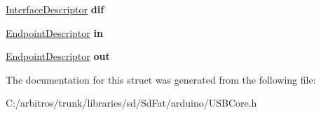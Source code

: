 \begin{DoxyCompactItemize}
\item 
\hypertarget{struct_c_d_c_descriptor_a631454a199b3c6c9ff9764fbe1b19568}{\hyperlink{struct_interface_descriptor}{Interface\-Descriptor} {\bfseries dif}}\label{struct_c_d_c_descriptor_a631454a199b3c6c9ff9764fbe1b19568}

\item 
\hypertarget{struct_c_d_c_descriptor_a93dcef3b3e3062b904269bcad94771b5}{\hyperlink{struct_endpoint_descriptor}{Endpoint\-Descriptor} {\bfseries in}}\label{struct_c_d_c_descriptor_a93dcef3b3e3062b904269bcad94771b5}

\item 
\hypertarget{struct_c_d_c_descriptor_afcf3c947c6e5ace7853bc3e313c0c4aa}{\hyperlink{struct_endpoint_descriptor}{Endpoint\-Descriptor} {\bfseries out}}\label{struct_c_d_c_descriptor_afcf3c947c6e5ace7853bc3e313c0c4aa}

\end{DoxyCompactItemize}


The documentation for this struct was generated from the following file\-:\begin{DoxyCompactItemize}
\item 
C\-:/arbitros/trunk/libraries/sd/\-Sd\-Fat/arduino/U\-S\-B\-Core.\-h\end{DoxyCompactItemize}
